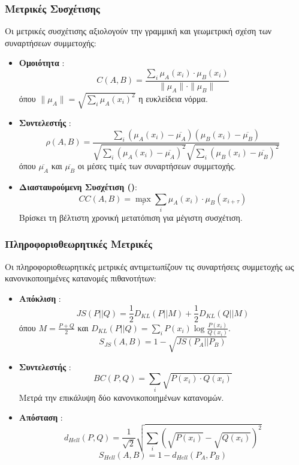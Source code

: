 \subsubsection{Μετρικές Συσχέτισης}

Οι μετρικές συσχέτισης αξιολογούν την γραμμική και γεωμετρική σχέση των συναρτήσεων συμμετοχής:

\begin{itemize}
    \item \textbf{Ομοιότητα }:
    \[C(A,B) = \frac{\sum_{i} \mu_A(x_i) \cdot \mu_B(x_i)}{\|\mu_A\| \cdot \|\mu_B\|}\]
    όπου \(\|\mu_A\| = \sqrt{\sum_{i} \mu_A(x_i)^2}\) η ευκλείδεια νόρμα.
    
    \item \textbf{Συντελεστής }:
    \[\rho(A,B) = \frac{\sum_{i} (\mu_A(x_i) - \overline{\mu_A})(\mu_B(x_i) - \overline{\mu_B})}{\sqrt{\sum_{i} (\mu_A(x_i) - \overline{\mu_A})^2} \sqrt{\sum_{i} (\mu_B(x_i) - \overline{\mu_B})^2}}\]
    όπου \(\overline{\mu_A}\) και \(\overline{\mu_B}\) οι μέσες τιμές των συναρτήσεων συμμετοχής.
    
    \item \textbf{Διασταυρούμενη Συσχέτιση ()}:
    \[CC(A,B) = \max_{\tau} \sum_{i} \mu_A(x_i) \cdot \mu_B(x_{i+\tau})\]
    Βρίσκει τη βέλτιστη χρονική μετατόπιση για μέγιστη συσχέτιση.
\end{itemize}

\subsubsection{Πληροφοριοθεωρητικές Μετρικές}

Οι πληροφοριοθεωρητικές μετρικές αντιμετωπίζουν τις συναρτήσεις συμμετοχής ως κανονικοποιημένες κατανομές πιθανοτήτων:

\begin{itemize}
    \item \textbf{Απόκλιση }:
    \[JS(P||Q) = \frac{1}{2}D_{KL}(P||M) + \frac{1}{2}D_{KL}(Q||M)\]
    όπου \(M = \frac{P+Q}{2}\) και \(D_{KL}(P||Q) = \sum_{i} P(x_i) \log \frac{P(x_i)}{Q(x_i)}\).
    \[S_{JS}(A,B) = 1 - \sqrt{JS(P_A||P_B)}\]
    
    \item \textbf{Συντελεστής }:
    \[BC(P,Q) = \sum_{i} \sqrt{P(x_i) \cdot Q(x_i)}\]
    Μετρά την επικάλυψη δύο κανονικοποιημένων κατανομών.
    
    \item \textbf{Απόσταση }:
    \[d_{Hell}(P,Q) = \frac{1}{\sqrt{2}} \sqrt{\sum_{i} (\sqrt{P(x_i)} - \sqrt{Q(x_i)})^2}\]
    \[S_{Hell}(A,B) = 1 - d_{Hell}(P_A,P_B)\]
\end{itemize}

